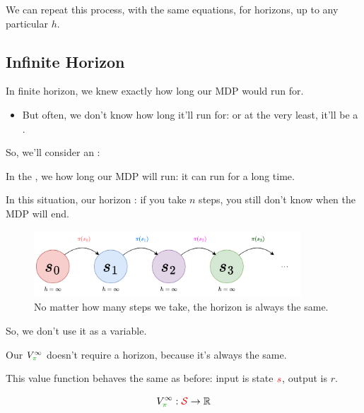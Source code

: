         We can repeat this process, with the same equations, for  horizons, up to any particular $h$.




        

    \pagebreak

    \subsection{Infinite Horizon}

        In finite horizon, we knew exactly how long our MDP would run for.
        
        \begin{itemize}
            \item But often, we don't know how long it'll run for: or at the very least, it'll be a .
        \end{itemize}

        So, we'll consider an :\\

        \begin{definition}
            In the , we  how long our MDP will run: it can run for a long time.
        \end{definition}

        In this situation, our horizon : if you take $n$ steps, you still don't know when the MDP will end.
 

        \begin{figure}[H]
            \centering
            \includegraphics[width=100mm,scale=0.5]{images/mdp_images/infinite_horizon.png}
            
            \caption*{No matter how many steps we take, the horizon is always the same.}
        \end{figure}

        So, we don't use it as a variable.\\

        \begin{definition}
            Our  $V_{\grn{\pi}}^{\infty}$ doesn't require a horizon, because it's always the same. 

            This value function behaves the same as before: input is state $\textcolor{red}{s}$, output is  $r$.

            \begin{equation*}
                V_{\grn{\pi}}^{\infty} : \red{\mathcal{S}} \to \RR
            \end{equation*}
        \end{definition}

